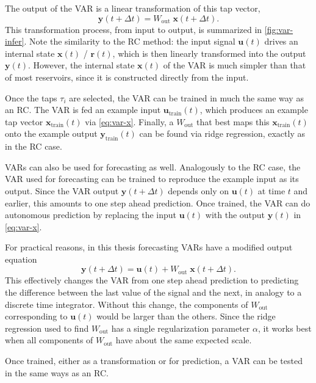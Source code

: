 The output of the VAR is a linear transformation of this tap vector,
\begin{equation}
  \label{eq:var-y}
  \bm{y}(t + \Delta t) = W_\text{out}\;\bm{x}(t + \Delta t).
\end{equation}
This transformation process, from input to output, is summarized in
\cref{fig:var-infer}. Note the similarity to the RC method: the input
signal $\bm{u}(t)$ drives an internal state $\bm{x}(t)$ / $\bm{r}(t)$,
which is then linearly transformed into the output
$\bm{y}(t)$. However, the internal state $\bm{x}(t)$ of the VAR is
much simpler than that of most reservoirs, since it is constructed
directly from the input.

Once the taps $\tau_i$ are selected, the VAR can be trained in much
the same way as an RC. The VAR is fed an example input
$\bm{u}_\text{train}(t)$, which produces an example tap vector
$\bm{x}_\text{train}(t)$ via \cref{eq:var-x}. Finally, a $W_\text{out}$
that best maps this $\bm{x}_\text{train}(t)$ onto the example output
$\bm{y}_\text{train}(t)$ can be found via ridge regression, exactly as
in the RC case.

VARs can also be used for forecasting as well. Analogously to the RC
case, the VAR used for forecasting can be trained to reproduce the
example input as its output. Since the VAR output $\bm{y}(t + \Delta
t)$ depends only on $\bm{u}(t)$ at time $t$ and earlier, this amounts
to one step ahead prediction. Once trained, the VAR can do autonomous
prediction by replacing the input $\bm{u}(t)$ with the output
$\bm{y}(t)$ in \cref{eq:var-x}.

For practical reasons, in this thesis forecasting VARs have a modified
output equation
\begin{equation}
  \bm{y}(t + \Delta t) = \bm{u}(t) + W_\text{out}\;\bm{x}(t + \Delta t).
\end{equation}
This effectively changes the VAR from one step ahead prediction to
predicting the difference between the last value of the signal and the
next, in analogy to a discrete time integrator. Without this change,
the components of $W_\text{out}$ corresponding to $\bm{u}(t)$ would be
larger than the others. Since the ridge regression used to find
$W_\text{out}$ has a single regularization parameter $\alpha$, it
works best when all components of $W_\text{out}$ have about the same
expected scale.

Once trained, either as a transformation or for prediction, a VAR can
be tested in the same ways as an RC.

